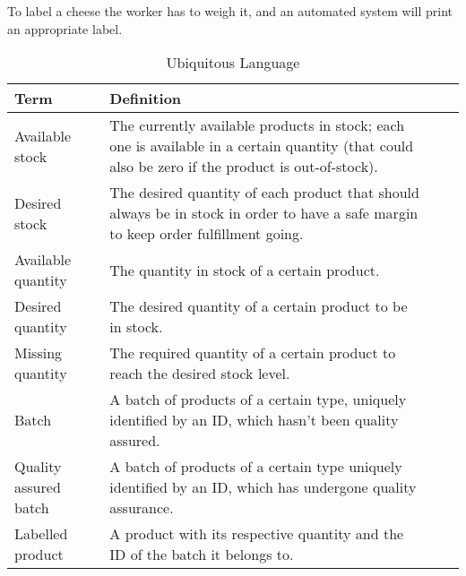 To label a cheese the worker has to weigh it, and an automated system will print an appropriate label.

\begin{table}[H]
    \centering
    \begin{tabular}{|p{}|*{3}{>{\arraybackslash}p{}|}}
        \hline
        Term                  & Definition                                                                                                                                       \\ \hline
        Available stock       & The currently available products in stock; each one is available in a certain quantity (that could also be zero if the product is out-of-stock). \\ \hline
        Desired stock         & The desired quantity of each product that should always be in stock in order to have a safe margin to keep order fulfillment going.              \\ \hline
        Available quantity    & The quantity in stock of a certain product.                                                                                                      \\ \hline
        Desired quantity      & The desired quantity of a certain product to be in stock.                                                                                        \\ \hline
        Missing quantity      & The required quantity of a certain product to reach the desired stock level.                                                                     \\ \hline
        Batch                 & A batch of products of a certain type, uniquely identified by an ID, which hasn't been quality assured.                                          \\ \hline
        Quality assured batch & A batch of products of a certain type uniquely identified by an ID, which has undergone quality assurance.                                       \\ \hline
        Labelled product      & A product with its respective quantity and the ID of the batch it belongs to.                                                                    \\ \hline
    \end{tabular}
    \caption{Ubiquitous Language}
\end{table}

